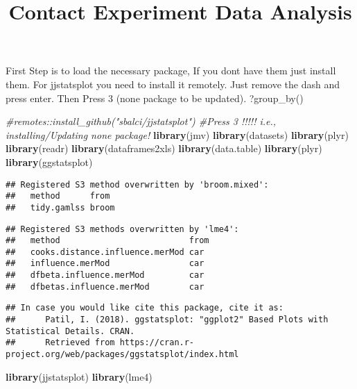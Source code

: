 \documentclass[
]{article}
\title{Contact Experiment Data Analysis}
\author{}
\date{\vspace{-2.5em}}
\newenvironment{Shaded}{\begin{snugshade}}{\end{snugshade}}
\newcommand{\CommentTok}[1]{\textcolor[rgb]{0.56,0.35,0.01}{\textit{#1}}}
\newcommand{\KeywordTok}[1]{\textcolor[rgb]{0.13,0.29,0.53}{\textbf{#1}}}
\newcommand{\NormalTok}[1]{#1}
\begin{document}
\maketitle

First Step is to load the necessary package, If you dont have them just
install them. For jjstatsplot you need to install it remotely. Just
remove the dash and press enter. Then Press 3 (none package to be
updated). ?group\_by()

\begin{Shaded}
\begin{Highlighting}[]
\CommentTok{#remotes::install_github("sbalci/jjstatsplot") #Press 3 !!!!! i.e., installing/Updating none package! }
\KeywordTok{library}\NormalTok{(jmv)}
\KeywordTok{library}\NormalTok{(datasets)}
\KeywordTok{library}\NormalTok{(plyr)}
\KeywordTok{library}\NormalTok{(readr)}
\KeywordTok{library}\NormalTok{(dataframes2xls)}
\KeywordTok{library}\NormalTok{(data.table)}
\KeywordTok{library}\NormalTok{(plyr)}
\KeywordTok{library}\NormalTok{(ggstatsplot)}
\end{Highlighting}
\end{Shaded}

\begin{verbatim}
## Registered S3 method overwritten by 'broom.mixed':
##   method      from 
##   tidy.gamlss broom
\end{verbatim}

\begin{verbatim}
## Registered S3 methods overwritten by 'lme4':
##   method                          from
##   cooks.distance.influence.merMod car 
##   influence.merMod                car 
##   dfbeta.influence.merMod         car 
##   dfbetas.influence.merMod        car
\end{verbatim}

\begin{verbatim}
## In case you would like cite this package, cite it as:
##      Patil, I. (2018). ggstatsplot: "ggplot2" Based Plots with Statistical Details. CRAN.
##      Retrieved from https://cran.r-project.org/web/packages/ggstatsplot/index.html
\end{verbatim}

\begin{Shaded}
\begin{Highlighting}[]
\KeywordTok{library}\NormalTok{(jjstatsplot)}
\KeywordTok{library}\NormalTok{(lme4)}
\end{Highlighting}
\end{Shaded}
\end{document}
